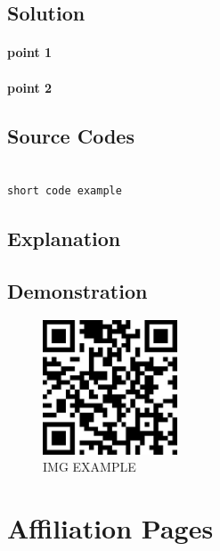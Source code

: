 \documentclass{book}
\begin{document}
\subsection{Solution}

\paragraph{point 1}

\paragraph{point 2}

\subsection{Source Codes}

\begin{minipage}[r]{15em}
\begin{verbatim}

short code example

\end{verbatim}
\end{minipage}

\subsection{Explanation}

\subsection{Demonstration}

\begin{figure}[H]
\centering
\includegraphics[height=4.0cm,width=4.0cm]{img/yhb_1.jpg}
\caption{IMG EXAMPLE}
\end{figure}

\section {Affiliation Pages}
\end{document}
